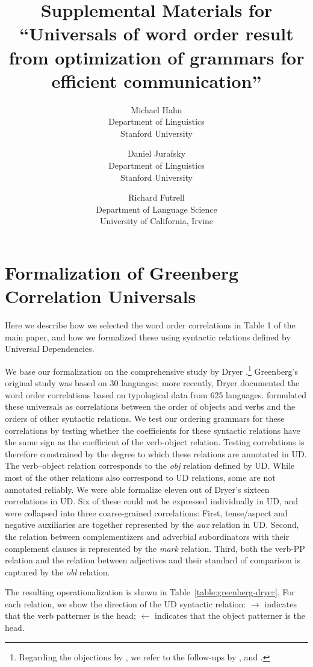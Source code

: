 \documentclass[10pt,twoside,lineno]{article}
\title{Supplemental Materials for ``Universals of word order result from optimization of grammars for efficient communication''}
\author{
        Michael Hahn \\
                Department of Linguistics\\
       Stanford University
            \and
       Daniel Jurafsky\\
       Department of Linguistics\\
       Stanford University \\
       \and
       Richard Futrell\\
       Department of Language Science\\
       University of California, Irvine
}
\begin{document}
\maketitle




\tableofcontents


\section{Formalization of Greenberg Correlation Universals}\label{sec:correlations}


Here we describe how we selected the word order correlations in Table 1 of the main paper, and how we formalized these using syntactic relations defined by Universal Dependencies.

We base our formalization on the comprehensive study by Dryer \cite{dryer1992greenbergian}.\footnote{Regarding the objections by \citet{dunn2011evolved}, we refer to the follow-ups by \citet{levy2011computational}, and \citet{croft2011greenbergian}.}
Greenberg's original study was based on 30 languages; more recently, Dryer \cite{dryer1992greenbergian} documented the word order correlations based on typological data from 625 languages.
\citet{dryer1992greenbergian} formulated these universals as correlations between the order of objects and verbs and the orders of other syntactic relations.
We test our ordering grammars for these correlations by testing whether the coefficients for these syntactic relations have the same sign as the coefficient of the verb-object relation.
Testing correlations is therefore constrained by the degree to which these relations are annotated in UD.
The verb--object relation corresponds to the  \emph{obj} relation defined by UD.
While most of the other relations also correspond to UD relations, some are not annotated reliably.
We were able formalize eleven out of Dryer's sixteen correlations in UD.
Six of these could not be expressed individually in UD, and were collapsed into three coarse-grained correlations:
First, tense/aspect and negative auxiliaries are together represented by the \emph{aux} relation in UD.
Second, the relation between complementizers and adverbial subordinators with their complement clauses is represented by the \emph{mark} relation.
Third, both the verb-PP relation and the relation between adjectives and their standard of comparison is captured by the \emph{obl} relation.

The resulting operationalization is shown in Table~\ref{table:greenberg-dryer}.
For each relation, we show the direction of the UD syntactic relation: $\rightarrow$ indicates that the verb patterner is the head; $\leftarrow$ indicates that the object patterner is the head.
\end{document}

